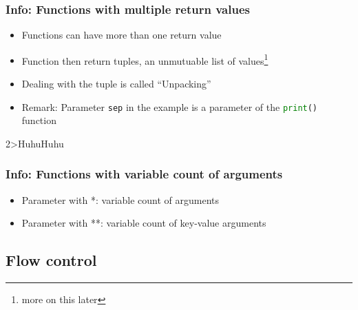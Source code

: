 \documentclass[english]{beamer}
\newcommand{\ta}[1]{\textattachfile[color=1 0 0]{#1}{Code}}
\begin{document}
\begin{frame}[containsverbatim]
\frametitle{Info: Functions with multiple return values}

\begin{itemize}
	\item Functions can have more than one return value
	\item Function then return tuples, an unmutuable list of values\footnote{more on this later}
	\item Dealing with the tuple is called \enquote{Unpacking}
	\item Remark: Parameter \texttt{sep} in the example is a parameter \newline of the \lstinline[language={Python}]{print()}  function
\end{itemize}



\vspace*{-1em}
\begin{ausgabe}
2>HuhuHuhu
\end{ausgabe}
\end{frame}

\begin{frame}
\frametitle{Info: Functions with variable count of arguments}

\begin{itemize}
\item Parameter with *: variable count of arguments
\item Parameter with **: variable count of key-value arguments
\end{itemize}





\end{frame}


\subsection{Flow control}
\end{document}
